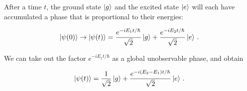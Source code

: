 \documentclass{article}
\begin{document}
After a time $t$, the ground state $\ket{g}$ and the excited state $\ket{e}$ will each have accumulated a phase that is proportional to their energies:

\begin{align}
                \ket{\psi(0)} \to \ket{\psi(t)} = \frac{e^{-iE_1 t/\hbar}}{\sqrt{2}} \ket{g} + \frac{e^{-iE_2 t/\hbar}}{\sqrt{2}} \ket{e}\, .
\end{align}

We can take out the factor $e^{-iE_1 t/\hbar}$ as a global unobservable phase, and obtain

\begin{align}\label{eq:atomequator}
                \ket{\psi(t)} = \frac{1}{\sqrt{2}} \ket{g} + \frac{e^{-i(E_2 - E_1)t/\hbar}}{\sqrt{2}} \ket{e}\, .
\end{align}
\end{document}
